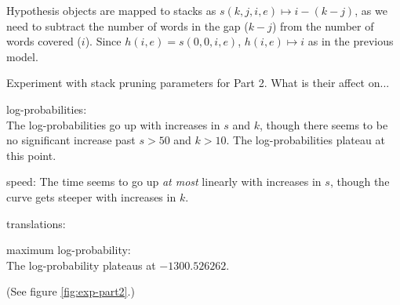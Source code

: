 \documentclass[answers]{exam}
\begin{document}
\begin{questions}
\begin{framed}
\end{framed}


\begin{framed}
  Hypothesis objects are mapped to stacks as $s(k,j,i,e)\mapsto i - (k - j)$, as
  we need to subtract the number of words in the gap ($k - j$) from the number
  of words covered ($i$). Since $h(i,e) = s(0,0,i,e)$, $h(i,e)\mapsto i$ as in
  the previous model.
\end{framed}


\addtocounter{question}{1}
\question[15] Experiment with stack pruning parameters for Part 2. What is their affect on...
\begin{framed}
\begin{compactenum}[a.]
\item log-probabilities:\\
  The log-probabilities go up with increases in $s$ and $k$, though there seems
  to be no significant increase past $s > 50$ and $k > 10$. The
  log-probabilities plateau at this point. 
\item speed:
  The time seems to go up \emph{at most} linearly with increases in $s$, though
  the curve gets steeper with increases in $k$.
\item translations:
\item maximum log-probability:\\
  The log-probability plateaus at $-1300.526262$.
\end{compactenum}
(See figure \ref{fig:exp-part2}.)
\end{framed}



\end{questions}
\end{document}
